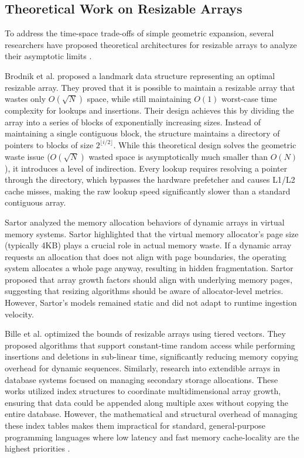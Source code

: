\subsection{Theoretical Work on Resizable Arrays}
To address the time-space trade-offs of simple geometric expansion, several 
researchers have proposed theoretical architectures for resizable arrays to analyze 
their asymptotic limits \cite{time_space_complexity}. 

Brodnik et al. \cite{optimal_resizable} proposed a landmark data structure 
representing an optimal resizable array. They proved that it is possible to 
maintain a resizable array that wastes only $O(\sqrt{N})$ space, while still 
maintaining $O(1)$ worst-case time complexity for lookups and insertions. Their 
design achieves this by dividing the array into a series of blocks of 
exponentially increasing sizes. Instead of maintaining a single contiguous block, 
the structure maintains a directory of pointers to blocks of size $2^{\lfloor i/2 \rfloor}$. 
While this theoretical design solves the geometric waste issue ($O(\sqrt{N})$ 
wasted space is asymptotically much smaller than $O(N)$), it introduces a level 
of indirection. Every lookup requires resolving a pointer through the directory, 
which bypasses the hardware prefetcher and causes L1/L2 cache misses, making the 
raw lookup speed significantly slower than a standard contiguous array.

Sartor \cite{z_rays} analyzed the memory allocation behaviors of 
dynamic arrays in virtual memory systems. Sartor highlighted that the virtual memory 
allocator's page size (typically 4KB) plays a crucial role in actual memory waste. 
If a dynamic array requests an allocation that does not align with page boundaries, 
the operating system allocates a whole page anyway, resulting in hidden 
fragmentation. Sartor proposed that array growth factors should align with 
underlying memory pages, suggesting that resizing algorithms should be aware of 
allocator-level metrics. However, Sartor's models remained static and did not 
adapt to runtime ingestion velocity.

Bille et al. \cite{resizable_optimal_time_space} optimized the bounds of resizable 
arrays using tiered vectors. They proposed algorithms that support constant-time 
random access while performing insertions and deletions in sub-linear time, 
significantly reducing memory copying overhead for dynamic sequences. Similarly, research 
into extendible arrays \cite{allocating_storage, managing_storage} in database 
systems focused on managing secondary storage allocations. These works utilized 
index structures to coordinate multidimensional array growth, ensuring that 
data could be appended along multiple axes without copying the entire database. 
However, the mathematical and structural overhead of managing these index 
tables makes them impractical for standard, general-purpose programming 
languages where low latency and fast memory cache-locality are the highest 
priorities \cite{fast_array}.

